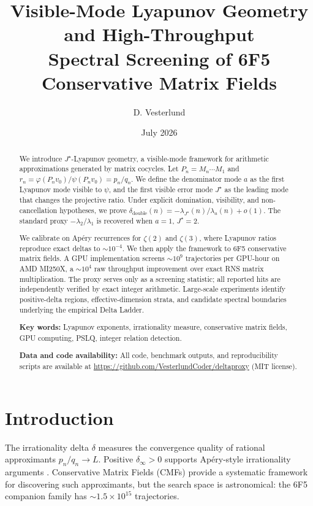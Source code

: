 \documentclass[11pt]{article}
\title{Visible-Mode Lyapunov Geometry and High-Throughput \\
Spectral Screening of 6F5 Conservative Matrix Fields}
\author{D. Vesterlund}
\date{July 2026}
\begin{document}
\maketitle

\begin{abstract}
We introduce $J^\star$-Lyapunov geometry, a visible-mode framework for arithmetic approximations generated by matrix cocycles. Let $P_n = M_n \cdots M_1$ and $r_n = \varphi(P_n v_0)/\psi(P_n v_0) = p_n/q_n$. We define the denominator mode $a$ as the first Lyapunov mode visible to $\psi$, and the first visible error mode $J^\star$ as the leading mode that changes the projective ratio. Under explicit domination, visibility, and non-cancellation hypotheses, we prove $\delta_{\mathrm{double}}(n) = -\lambda_{J^\star}(n)/\lambda_a(n) + o(1)$. The standard proxy $-\lambda_2/\lambda_1$ is recovered when $a=1$, $J^\star=2$.

We calibrate on Ap\'ery recurrences for $\zeta(2)$ and $\zeta(3)$, where Lyapunov ratios reproduce exact deltas to $\sim 10^{-4}$. We then apply the framework to 6F5 conservative matrix fields. A GPU implementation screens $\sim 10^9$ trajectories per GPU-hour on AMD MI250X, a $\sim 10^4$ raw throughput improvement over exact RNS matrix multiplication. The proxy serves only as a screening statistic; all reported hits are independently verified by exact integer arithmetic. Large-scale experiments identify positive-delta regions, effective-dimension strata, and candidate spectral boundaries underlying the empirical Delta Ladder.

\medskip
\noindent\textbf{Key words:} Lyapunov exponents, irrationality measure, conservative matrix fields, GPU computing, PSLQ, integer relation detection.

\medskip
\noindent\textbf{Data and code availability:} All code, benchmark outputs, and reproducibility scripts are available at \url{https://github.com/VesterlundCoder/deltaproxy} (MIT license).
\end{abstract}

\tableofcontents

\section{Introduction}

The irrationality delta $\delta$ measures the convergence quality of rational approximants $p_n/q_n \to L$. Positive $\delta_\infty > 0$ supports Ap\'ery-style irrationality arguments \cite{apery1979}. Conservative Matrix Fields (CMFs) \cite{raayoni2021,elimelech2024} provide a systematic framework for discovering such approximants, but the search space is astronomical: the 6F5 companion family has $\sim 1.5 \times 10^{15}$ trajectories.
\end{document}
